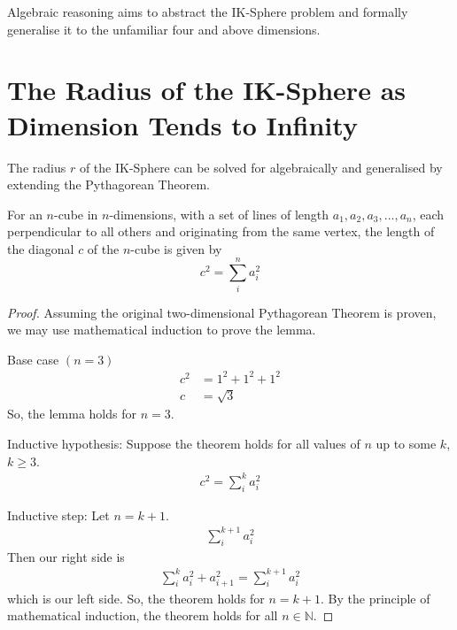 \noindent Algebraic reasoning aims to abstract the IK-Sphere problem and formally generalise it to the unfamiliar four and above dimensions.

\section{The Radius of the IK-Sphere as Dimension Tends to Infinity}
The radius $r$ of the IK-Sphere can be solved for algebraically and generalised by extending the Pythagorean Theorem.
\begin{lemma}\label{lemma:extend pythag}
    For an $n$-cube in $n$-dimensions, with a set of lines of length $a_1, a_2, a_3, ... , a_n$, each perpendicular to all others and originating from the same vertex, the length of the diagonal $c$ of the $n$-cube is given by
    \begin{equation}\label{extendedpythag}
        c^2 = \sum_{i}^{n}a_i^2
    \end{equation}
\end{lemma}
\begin{proof}

    Assuming the original two-dimensional Pythagorean Theorem is proven, we may use mathematical induction to prove the lemma.
    
    \noindent 
    Base case $\left(n=3\right)$
    \begin{equation*}
        \begin{split}
            c^2&=1^2+1^2+1^2\\
            c&=\sqrt{3}
        \end{split}
    \end{equation*}
    So, the lemma holds for $n=3$.
    
    \noindent Inductive hypothesis: Suppose the theorem holds for all values of $n$ up to some $k$, $k \geq 3$.
    \begin{equation*}
        \begin{split}
            c^2=\sum_{i}^{k}a_i^2
        \end{split}
    \end{equation*}
    
    \noindent Inductive step: Let $n=k+1$. 
    \begin{equation*}
        \begin{split}
        \sum_{i}^{k+1}a^2_{i}
        \end{split}
    \end{equation*}
    Then our right side is
    \begin{equation*}
        \begin{split}
        \sum_{i}^{k}a_i^2+a_{i+1}^2=\sum_{i}^{k+1}a^2_{i}
        \end{split}
    \end{equation*}
    which is our left side. So, the theorem holds for $n=k+1$. 
    By the principle of mathematical induction, the theorem holds for all $n \in \mathbb{N}$.
\end{proof}
